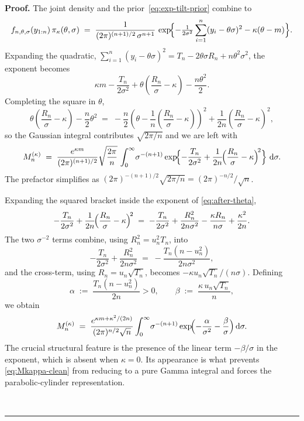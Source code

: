 \documentclass{article}%
\newenvironment{proof}[1][Proof]{\noindent\textbf{#1.} }{\ \rule{0.5em}{0.5em}}
\newcommand{\dd}{\,\mathrm{d}}
\newcommand{\1}{\mathbf{1}}
\begin{document}
\begin{proof}
The joint density and the prior~\eqref{eq:exp-tilt-prior} combine to
\begin{equation}\label{eq:integrand}
  f_{n,\theta,\sigma}(y_{1:n})\,\pi_\kappa(\theta,\sigma)
  \;=\;\frac{1}{(2\pi)^{(n+1)/2}\,\sigma^{n+1}}\,
  \exp\!\Bigl\{-\tfrac{1}{2\sigma^2}\sum_{i=1}^n(y_i-\theta\sigma)^2
  -\kappa(\theta-m)\Bigr\}.
\end{equation}
Expanding the quadratic, $\sum_{i=1}^n(y_i-\theta\sigma)^2
=T_n-2\theta\sigma R_n+n\theta^2\sigma^2$, the exponent becomes
\[
  \kappa m-\frac{T_n}{2\sigma^2}
  +\theta\!\left(\frac{R_n}{\sigma}-\kappa\right)-\frac{n\theta^2}{2}.
\]
Completing the square in $\theta$,
\[
  \theta\!\left(\frac{R_n}{\sigma}-\kappa\right)-\frac{n}{2}\theta^2
  \;=\;-\frac{n}{2}\!\left(\theta-\frac{1}{n}\!\left(\frac{R_n}{\sigma}-\kappa\right)\right)^{\!2}
  +\frac{1}{2n}\!\left(\frac{R_n}{\sigma}-\kappa\right)^{\!2}\!,
\]
so the Gaussian integral contributes $\sqrt{2\pi/n}$
and we are left with
\begin{equation}\label{eq:after-theta}
  M_n^{(\kappa)}
  \;=\;\frac{e^{\kappa m}}{(2\pi)^{(n+1)/2}}\sqrt{\frac{2\pi}{n}}\,
  \int_0^\infty\!\sigma^{-(n+1)}
  \exp\!\Bigl\{-\frac{T_n}{2\sigma^2}
  +\frac{1}{2n}\!\Bigl(\frac{R_n}{\sigma}-\kappa\Bigr)^{\!2}\Bigr\}\,\dd\sigma.
\end{equation}
The prefactor simplifies as $(2\pi)^{-(n+1)/2}\sqrt{2\pi/n}
=(2\pi)^{-n/2}/\sqrt n$.

Expanding the squared bracket inside the exponent of
\eqref{eq:after-theta},
\[
  -\frac{T_n}{2\sigma^2}
  +\frac{1}{2n}\!\Bigl(\frac{R_n}{\sigma}-\kappa\Bigr)^{\!2}
  \;=\;-\frac{T_n}{2\sigma^2}+\frac{R_n^2}{2n\sigma^2}
  -\frac{\kappa R_n}{n\sigma}+\frac{\kappa^2}{2n}.
\]
The two $\sigma^{-2}$ terms combine, using $R_n^2=u_n^2 T_n$, into
\[
  -\frac{T_n}{2\sigma^2}+\frac{R_n^2}{2n\sigma^2}
  \;=\;-\frac{T_n(n-u_n^2)}{2n\sigma^2},
\]
and the cross-term, using $R_n=u_n\sqrt{T_n}$, becomes
$-\kappa u_n\sqrt{T_n}/(n\sigma)$. Defining
\begin{equation}\label{eq:ab}
  \alpha\;:=\;\frac{T_n(n-u_n^2)}{2n}>0,\qquad
  \beta\;:=\;\frac{\kappa\,u_n\sqrt{T_n}}{n},
\end{equation}
we obtain
\begin{equation}\label{eq:Mkappa-clean}
  M_n^{(\kappa)}
  \;=\;\frac{e^{\kappa m+\kappa^2/(2n)}}{(2\pi)^{n/2}\sqrt n}
  \int_0^\infty\!\sigma^{-(n+1)}
  \exp\!\Bigl(-\frac{\alpha}{\sigma^2}-\frac{\beta}{\sigma}\Bigr)\dd\sigma.
\end{equation}
The crucial structural feature is the presence of the linear term
$-\beta/\sigma$ in the exponent, which is absent when $\kappa=0$. Its
appearance is what prevents \eqref{eq:Mkappa-clean} from reducing to a
pure Gamma integral and forces the parabolic-cylinder representation.


\end{proof}
\end{document}
